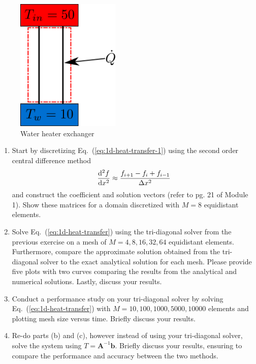 \begin{figure}[H]
    \includegraphics[height=2.5in]{../media/control-volume}
    \caption{Water heater exchanger}
    \label{fig:control-volume}
\end{figure}

\begin{enumerate}[label=(\alph*)]
    \item Start by discretizing Eq.~(\ref{eq:1d-heat-transfer-1}) using the
        second order central difference method
        \begin{equation}
            \dv[2]{f}{x} \approx
                    \frac{f_{i+1} - f_{i} + f_{i-1}}{\Delta x^{2}}
        \end{equation}
        and construct the coefficient and solution vectors (refer to pg. 21
        of Module 1). Show these matrices for a domain discretized with
        $M=8$ equidistant elements.    

    \item Solve Eq.~(\ref{eq:1d-heat-transfer}) using the tri-diagonal
        solver from the previous exercise on a mesh of $M=4, 8, 16, 32, 64$
        equidistant elements. Furthermore, compare the approximate solution
        obtained from the tri-diagonal solver to the exact analytical
        solution for each mesh. Please provide five plots with two curves
        comparing the results from the analytical and numerical solutions.
        Lastly, discuss your results.

    \item Conduct a performance study on your tri-diagonal solver by
        solving Eq.~(\ref{eq:1d-heat-transfer}) with $M=10, 100, 1000,
        5000, 10000$ elements and plotting mesh size versus time. Briefly
        discuss your results.

    \item Re-do parts (b) and (c), however instead of using your
        tri-diagonal solver, solve the system using 
        $T=\mathbf{A}^{-1}\mathbf{b}$. Briefly discuss your results,
        ensuring to compare the performance and accuracy between the two
        methods.
\end{enumerate}

